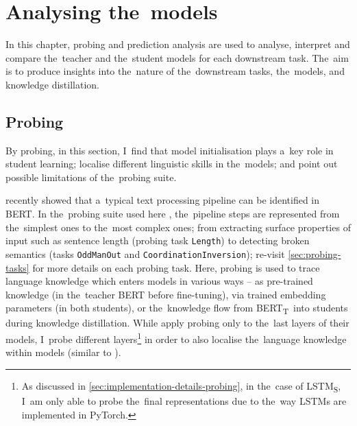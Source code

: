 \documentclass[bsc,frontabs,singlespacing,parskip,deptreport]{infthesis}
\def\BERTT{BERT\textsubscript{T}}
\def\LSTMS{LSTM\textsubscript{S}}
\begin{document}
\chapter{Analysing the~models}{
  In this chapter, probing and prediction analysis are used to analyse, interpret and compare the~teacher and the~student models for each downstream task. 
  The~aim is to produce insights into the~nature of the~downstream tasks, the~models, and knowledge distillation.

  \section{Probing}{
    By probing, in this section, I~find that model initialisation plays a~key role in student learning; localise different linguistic skills in the~models; and point out possible limitations of the~probing suite.

    \citet{Tenney_2019b} recently showed that a~typical text processing pipeline can be identified in BERT.    
    In the~probing suite used here \citep{Conneau_2018}, the~pipeline steps are represented from the~simplest ones to the~most complex ones; from extracting surface properties of input such as sentence length (probing task \verb|Length|) to detecting broken semantics (tasks \verb|OddManOut| and \verb|CoordinationInversion|); re-visit \autoref{sec:probing-tasks} for more details on each probing task.
    Here, probing is used to trace language knowledge which enters models in various ways -- as pre-trained knowledge (in the~teacher BERT before fine-tuning), via trained embedding parameters (in both students), or the~knowledge flow from \BERTT~into students during knowledge distillation.
    While \citeauthor{Conneau_2018} apply probing only to the~last layers of their models, I~probe different layers\footnote{As discussed in \autoref{sec:implementation-details-probing}, in the~case of \LSTMS, I~am only able to probe the~final representations due to the~way LSTMs are implemented in PyTorch.} in order to also localise the~language knowledge within models (similar to \citeauthor{Tenney_2019b}).
    
}}
\end{document}
